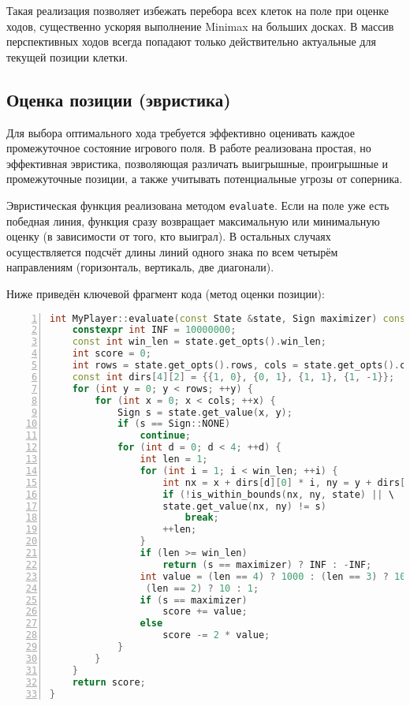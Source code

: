 \noindent Такая реализация позволяет избежать перебора всех клеток на поле при оценке ходов, существенно ускоряя выполнение Minimax на больших досках. В массив перспективных ходов всегда попадают только действительно актуальные для текущей позиции клетки.

\subsection{Оценка позиции (эвристика)}

Для выбора оптимального хода требуется эффективно оценивать каждое промежуточное состояние игрового поля. В работе реализована простая, но эффективная эвристика, позволяющая различать выигрышные, проигрышные и промежуточные позиции, а также учитывать потенциальные угрозы от соперника.

\vspace{1ex}

Эвристическая функция реализована методом \texttt{evaluate}. Если на поле уже есть победная линия, функция сразу возвращает максимальную или минимальную оценку (в зависимости от того, кто выиграл). В остальных случаях осуществляется подсчёт длины линий одного знака по всем четырём направлениям (горизонталь, вертикаль, две диагонали).

\vspace{1ex}

Ниже приведён ключевой фрагмент кода (метод оценки позиции):

\begin{lstlisting}[language=C++,caption={Эвристическая функция оценки позиции},label={lst:evaluate},numbers=left]
int MyPlayer::evaluate(const State &state, Sign maximizer) const {
    constexpr int INF = 10000000;
    const int win_len = state.get_opts().win_len;
    int score = 0;
    int rows = state.get_opts().rows, cols = state.get_opts().cols;
    const int dirs[4][2] = {{1, 0}, {0, 1}, {1, 1}, {1, -1}};
    for (int y = 0; y < rows; ++y) {
        for (int x = 0; x < cols; ++x) {
            Sign s = state.get_value(x, y);
            if (s == Sign::NONE)
                continue;
            for (int d = 0; d < 4; ++d) {
                int len = 1;
                for (int i = 1; i < win_len; ++i) {
                    int nx = x + dirs[d][0] * i, ny = y + dirs[d][1] * i;
                    if (!is_within_bounds(nx, ny, state) || \
                    state.get_value(nx, ny) != s)
                        break;
                    ++len;
                }
                if (len >= win_len)
                    return (s == maximizer) ? INF : -INF;
                int value = (len == 4) ? 1000 : (len == 3) ? 100 : \
                 (len == 2) ? 10 : 1;
                if (s == maximizer)
                    score += value;
                else
                    score -= 2 * value;
            }
        }
    }
    return score;
}
\end{lstlisting}

